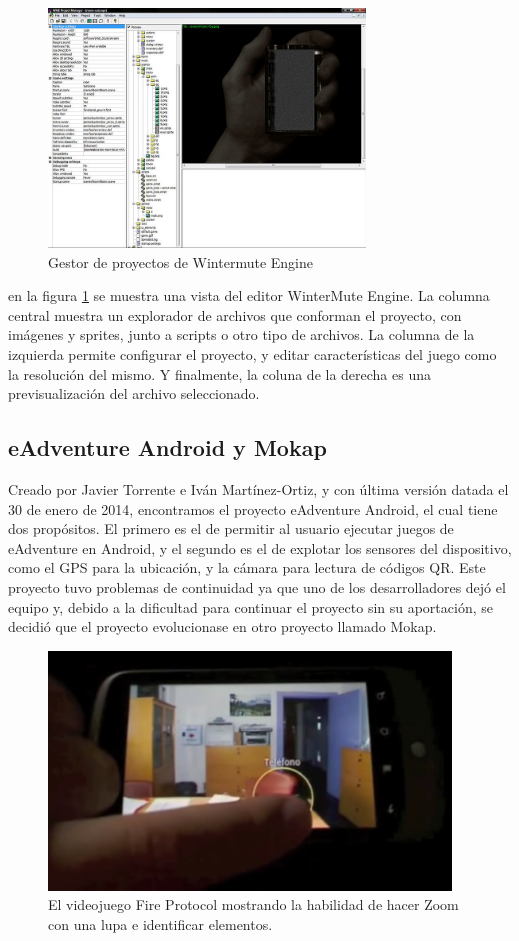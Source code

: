 \begin{figure}[htb]
	\centerline{\includegraphics[height=2.5in]{figures/wme.jpg}}
	\caption[WinterMute Engine]{Gestor de proyectos de Wintermute Engine}
	\label{wmengine}
\end{figure}

en la figura \ref{wmengine} se muestra una vista del editor WinterMute Engine. La columna central muestra un explorador de archivos que conforman el proyecto, con imágenes y sprites, junto a scripts o otro tipo de archivos. La columna de la izquierda permite configurar el proyecto, y editar características del juego como la resolución del mismo. Y finalmente, la coluna de la derecha es una previsualización del archivo seleccionado.

\subsection{eAdventure Android y Mokap}
\label{eandroidmokap}

Creado por Javier Torrente e Iván Martínez-Ortiz, y con última versión datada el 30 de enero de 2014, encontramos el proyecto eAdventure Android, el cual tiene dos propósitos. El primero es el de permitir al usuario ejecutar juegos de eAdventure en Android, y el segundo es el de explotar los sensores del dispositivo, como el GPS para la ubicación, y la cámara para lectura de códigos QR. Este proyecto tuvo problemas de continuidad ya que uno de los desarrolladores dejó el equipo y, debido a la dificultad para continuar el proyecto sin su aportación, se decidió que el proyecto evolucionase en otro proyecto llamado Mokap.

\begin{figure}[htb]
	\centerline{\includegraphics[height=2.5in]{figures/eandroid.png}}
	\caption[eAdventure Android - Lupa]{El videojuego Fire Protocol mostrando la habilidad de hacer Zoom con una lupa e identificar elementos.}
	\label{eandroidlupa}
\end{figure}

